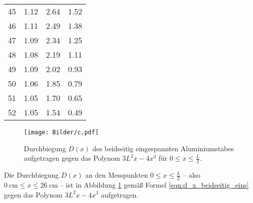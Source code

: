 \begin{longtable}[c]{cccc}
	45                        & 1.12                           & 2.64                                      & 1.52                         \\
	46                        & 1.11                           & 2.49                                      & 1.38                         \\
	47                        & 1.09                           & 2.34                                      & 1.25                         \\
	48                        & 1.08                           & 2.19                                      & 1.11                         \\
	49                        & 1.09                           & 2.02                                      & 0.93                         \\
	50                        & 1.06                           & 1.85                                      & 0.79                         \\
	51                        & 1.05                           & 1.70                                      & 0.65                         \\
	52                        & 1.05                           & 1.54                                      & 0.49                         \\
\end{longtable}

\begin{figure}
	\centering
	\texttt{[image: Bilder/c.pdf]}
	\caption{Durchbiegung $D(x)$ des beidseitig eingespannten Aluminiumstabes aufgetragen gegen das Polynom $3L^2x - 4x^3$ für $0 \leq x \leq \frac{L}{2}$.}
	\label{fig:Stabus}
\end{figure}

Die Durchbiegung $D(x)$ an den Messpunkten $0 \leq x \leq \frac{L}{2}$ -- also
$\SI{0}{\centi\meter} \leq x \leq \SI{26}{\centi\meter}$ -- ist in Abbildung \ref{fig:Stabus}
gemäß Formel \eqref{eqn:d_x_beidseitig_eins} gegen das
Polynom $3L^2x - 4x^3$ aufgetragen.

